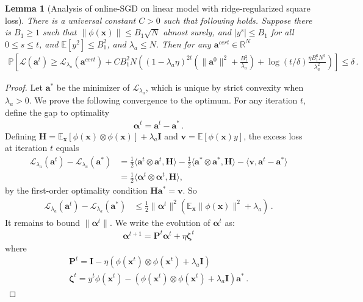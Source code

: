 \documentclass[11pt]{article}
\renewcommand{\P}{\mathbb{P}}
\newcommand{\E}{\mathbb{E}}
\newcommand{\R}{\mathbb{R}}
\newcommand{\<}{\langle}
\renewcommand{\>}{\rangle}
\newtheorem{lemma}{Lemma}
\theoremstyle{definition}
\def\bI{{\boldsymbol I}}
\def\bH{{\boldsymbol H}}
\def\bP{{\boldsymbol P}}
\def\ba{{\boldsymbol a}}
\def\bv{{\boldsymbol v}}
\def\bx{{\boldsymbol x}}
\def\cL{{\mathcal L}}
\def\bv{{\boldsymbol v}}
\def\bx{{\boldsymbol x}}
\def\ba{{\boldsymbol a}}
\def\bH{{\boldsymbol H}}
\def\bP{{\boldsymbol P}}
\def\bzeta{{\boldsymbol \zeta}}
\def\balpha{{\boldsymbol \alpha}}
\begin{document}
\begin{lemma}[Analysis of online-SGD on linear model with ridge-regularized square loss]\label{lem:second-layer-certificate-square-loss}
There is a universal constant $C > 0$ such that following holds. Suppose there is $B_1 \geq 1$ such that $\|\phi(\bx)\| \leq B_1 \sqrt{N}$ almost surely, and $|y^s| \leq B_1$ for all $0 \leq s \leq t$, and $\E[y^2] \leq B_1^2$, and $\lambda_a \leq N$. Then for any $\ba^{cert} \in \R^N$
\begin{align*}
\P\left[\cL(\ba^t) \geq \cL_{\lambda_a}(\ba^{cert}) + C B_1^2 N \left((1-\lambda_a \eta)^{2t} (\|\ba^0\|^2 + \frac{B_1^2}{\lambda_a}) + \log(t / \delta) \frac{\eta B_1^6 N^2}{\lambda_a^2}\right)\right] \leq \delta\,.
\end{align*}
\end{lemma}
\begin{proof}
Let $\ba^*$ be the minimizer of $\cL_{\lambda_a}$, which is unique by strict convexity when $\lambda_a > 0$. We prove the following convergence to the optimum. For any iteration $t$, define the gap to optimality
\begin{align*}
\balpha^t = \ba^t - \ba^*\,.
\end{align*}
Defining $\bH = \E_\bx[\phi(\bx) \otimes \phi(\bx)] + \lambda_a \bI$ and $\bv = \E[\phi(\bx)y]$, the excess loss at iteration $t$ equals
\begin{align*}\cL_{\lambda_a}(\ba^t) - \cL_{\lambda_a}(\ba^*) &= \frac{1}{2} \<\ba^t \otimes \ba^t, \bH\> - \frac{1}{2} \<\ba^* \otimes \ba^*, \bH\>-\<\bv,\ba^t - \ba^*\> \\
&= \frac{1}{2} \<\balpha^t \otimes \balpha^t, \bH\> ,
\end{align*}
by the first-order optimality condition $\bH \ba^* = \bv$. So 
\begin{align}\label{eq:linear-optimality-gap}
\cL_{\lambda_a}(\ba^t) - \cL_{\lambda_a}(\ba^*) &\leq \frac{1}{2} \|\balpha^t\|^2 (\E_\bx \|\phi(\bx)\|^2 + \lambda_a)\,.
\end{align}
It remains to bound $\|\balpha^t\|$. We write the evolution of $\balpha^t$ as:
\begin{align*}
\balpha^{t+1} = \bP^t \balpha^t + \eta \bzeta^t
\end{align*}
where
\begin{align*}
\bP^t = \bI - \eta (\phi(\bx^t) \otimes \phi(\bx^t) + \lambda_a \bI) \\
\bzeta^t = y^t \phi(\bx^t) - (\phi(\bx^t) \otimes \phi(\bx^t) + \lambda_a \bI) \ba^*\,.
\end{align*}


\end{proof}
\end{document}
